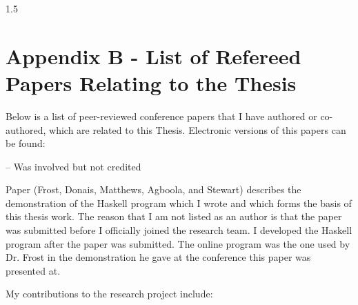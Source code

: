 \documentclass[fleqn, oneside, 12pt]{book}
\theoremstyle{definitionsty}
\newcommand{\uwinonehalfspacelen}{1.5}
\newcommand{\uwindefaultspacelen}{\uwinonehalfspacelen}
\newenvironment{uwindefaultspaceenv}%
{\begin{spacing}{\uwindefaultspacelen}}%
	{\end{spacing}}
\begin{document}
\begin{uwindefaultspaceenv}
\section*{Appendix B - List of Refereed Papers Relating to the Thesis}
\label{appendix:b}

Below is a list of peer-reviewed conference papers that I have authored or co-authored, which are related to this Thesis.  Electronic versions of this papers can be found: %



\cite{donais2013system} 

\cite{peelar2017windsor} 

\cite{peelar2018toolpath} 

\cite{frost2014demonstration}  -- Was involved but not credited

Paper \cite{frost2014demonstration} (Frost, Donais, Matthews, Agboola, and Stewart) describes the demonstration of the Haskell program which I wrote and which forms the basis of this thesis work.  The reason that I am not listed as an author is that the paper was submitted before I officially joined the research team.  I developed the Haskell program after the paper was submitted.  The online program was the one used by Dr. Frost in the demonstration he gave at the conference this paper was presented at.

My contributions to the research project include:


\end{uwindefaultspaceenv}
\end{document}
